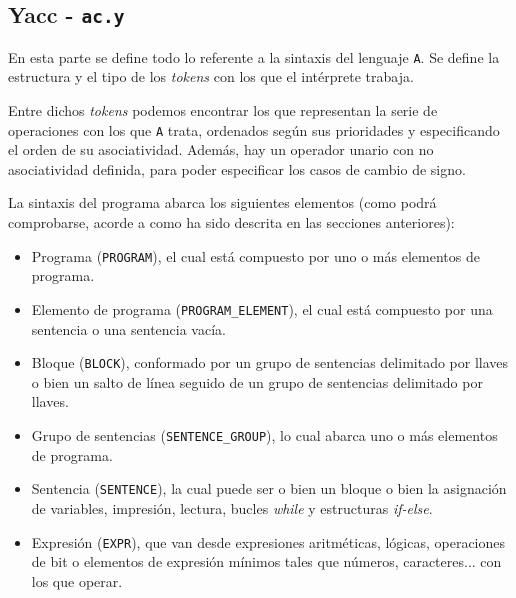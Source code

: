 \documentclass[12pt]{article}
\begin{document}
\subsection{Yacc - \texttt{ac.y}}
En esta parte se define todo lo referente a la sintaxis del lenguaje \texttt{A}. Se define la estructura y el tipo de los \textit{tokens} con los que el intérprete trabaja.
\par
Entre dichos \textit{tokens} podemos encontrar los que representan la serie de operaciones con los que \texttt{A} trata, ordenados según sus prioridades y especificando el orden de su asociatividad. Además, hay un operador unario con no asociatividad definida, para poder especificar los casos de cambio de signo.

\par
La sintaxis del programa abarca los siguientes elementos (como podrá comprobarse, acorde a como ha sido descrita en las secciones anteriores):
\begin{itemize}
    \item Programa (\texttt{PROGRAM}), el cual está compuesto por uno o más elementos de programa.
    \item Elemento de programa (\texttt{PROGRAM\_ELEMENT}), el cual está compuesto por una sentencia o una sentencia vacía.
    \item Bloque (\texttt{BLOCK}), conformado por un grupo de sentencias delimitado por llaves o bien un salto de línea seguido de un grupo de sentencias delimitado por llaves.
    \item Grupo de sentencias (\texttt{SENTENCE\_GROUP}), lo cual abarca uno o más elementos de programa.
    \item Sentencia (\texttt{SENTENCE}), la cual puede ser o bien un bloque o bien la asignación de variables, impresión, lectura, bucles \textit{while} y estructuras \textit{if-else}.
    \item Expresión (\texttt{EXPR}), que van desde expresiones aritméticas, lógicas, operaciones de bit o elementos de expresión mínimos tales que números, caracteres... con los que operar.
\end{itemize}
\end{document}
